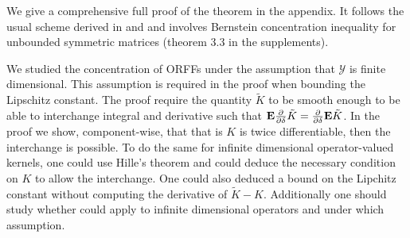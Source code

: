 We give a comprehensive full proof of the theorem in the appendix. It follows the usual scheme derived in \citet{Rahimi2007} and \citet{sutherland2015} and involves Bernstein concentration inequality for unbounded symmetric matrices (theorem 3.3 in the supplements).
\begin{remark}\label{remark:infinite_dimension}
We studied the concentration of ORFFs under the assumption that $\mathcal{Y}$ is finite dimensional. This assumption is required in the proof when bounding the Lipschitz constant. The proof require the quantity $\tilde{K}$ to be smooth enough to be able to interchange integral and derivative such that ${\mathbf{{E}}}\frac{\partial}{\partial \delta}\tilde{K}=\frac{\partial}{\partial \delta}{\mathbf{{E}}}\tilde{K}$. In the proof we show, component-wise, that that is $K$ is twice differentiable, then the interchange is possible. To do the same for infinite dimensional operator-valued kernels, one could use Hille's theorem and could deduce the necessary condition on $K$ to allow the interchange. One could also deduced a bound on the Lipchitz constant without computing the derivative of $\tilde{K}-K$. Additionally one should study whether \citet[theorem 4]{koltchinskii2013remark} could apply to infinite dimensional operators and under which assumption.
\end{remark}

